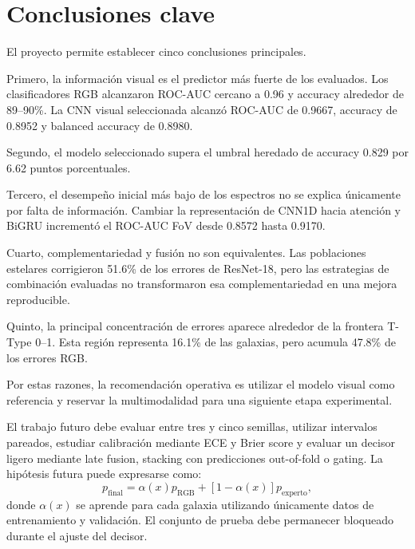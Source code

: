 \documentclass[letterpaper,11pt]{article}
\begin{document}
\section{Conclusiones clave} 

El proyecto permite establecer cinco conclusiones principales. 

Primero, la información visual es el predictor más fuerte de los evaluados. Los clasificadores RGB alcanzaron ROC-AUC cercano a 0.96 y accuracy alrededor de 89--90\%. La CNN visual seleccionada alcanzó ROC-AUC de 0.9667, accuracy de 0.8952 y balanced accuracy de 0.8980. 

Segundo, el modelo seleccionado supera el umbral heredado de accuracy 0.829 por 6.62 puntos porcentuales.

Tercero, el desempeño inicial más bajo de los espectros no se explica únicamente por falta de información. Cambiar la representación de CNN1D hacia atención y BiGRU incrementó el ROC-AUC FoV desde 0.8572 hasta 0.9170. 

Cuarto, complementariedad y fusión no son equivalentes. Las poblaciones estelares corrigieron 51.6\% de los errores de ResNet-18, pero las estrategias de combinación evaluadas no transformaron esa complementariedad en una mejora reproducible. 

Quinto, la principal concentración de errores aparece alrededor de la frontera T-Type 0--1. Esta región representa 16.1\% de las galaxias, pero acumula 47.8\% de los errores RGB. 

Por estas razones, la recomendación operativa es utilizar el modelo visual como referencia y reservar la multimodalidad para una siguiente etapa experimental.

El trabajo futuro debe evaluar entre tres y cinco semillas, utilizar intervalos pareados, estudiar calibración mediante ECE y Brier score y evaluar un decisor ligero mediante late fusion, stacking con predicciones out-of-fold o gating. La hipótesis futura puede expresarse como: \[ p_{\mathrm{final}} = \alpha(x)p_{\mathrm{RGB}} + [1-\alpha(x)]p_{\mathrm{experto}}, \] donde $\alpha(x)$ se aprende para cada galaxia utilizando únicamente datos de entrenamiento y validación. El conjunto de prueba debe permanecer bloqueado durante el ajuste del decisor.

\end{document}
